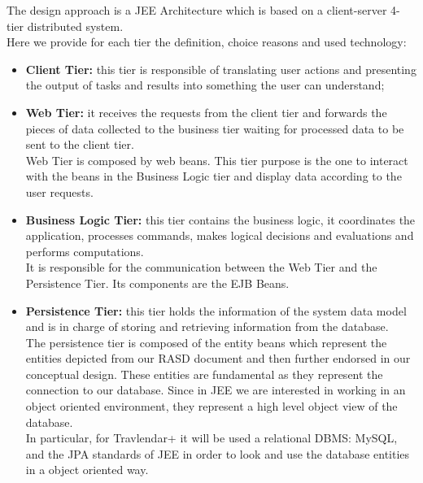 The design approach is a JEE Architecture which is based on a client-server 4-tier distributed system.
\\Here we provide for each tier the definition, choice reasons and used technology:

\begin{itemize}
\item \textbf{Client Tier:} this tier is responsible of translating user actions and presenting the output of tasks and results into something the user can understand;

\item \textbf{Web Tier:} it receives the requests from the client tier and forwards the pieces of data collected to the business tier waiting for processed data to be sent to the client tier.
\\
Web Tier is composed by web beans. This tier purpose is the one to interact with the beans in the Business Logic tier and display data according to the user requests.

\item \textbf{Business Logic Tier:} this tier contains the business logic, it coordinates the application, processes commands, makes logical decisions and evaluations and performs computations.\\
It is responsible for the communication between the Web Tier and the Persistence Tier. Its components are the EJB Beans.


\item \textbf{Persistence Tier:} this tier holds the information of the system data model and is in charge of storing and retrieving information from the database.
\\
The persistence tier is composed of the entity beans which represent the entities depicted from our RASD document and then further endorsed in our conceptual design. These entities are fundamental as they represent the connection to our database. Since in JEE we are interested in working in an object oriented environment, they represent a high level object view of the database.\\
In particular, for Travlendar+ it will be used a relational DBMS: MySQL, and the JPA standards of JEE in order to look and use the database entities in a object oriented way.
\end{itemize}


